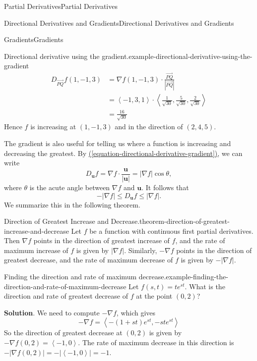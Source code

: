 \documentclass[10pt,]{book}
\numberwithin{equation}{section}
\newcommand{\vv}[1]{\mathbf{#1}}
\newcommand{\grad}{\nabla}
\newcommand{\dotprod}[1]{\left\langle #1 \right\rangle}
\begin{document}
\begin{chapterptx}{Partial Derivatives}{}{Partial Derivatives}{}{}
\begin{sectionptx}{Directional Derivatives and Gradients}{}{Directional Derivatives and Gradients}{}{}
\begin{subsectionptx}{Gradients}{}{Gradients}{}{}
\begin{example}{Directional derivative using the gradient.}{example-directional-derivative-using-the-gradient}
\begin{align*}
D_{\vec{PQ}}f(1,-1,3) & = \grad f (1,-1,3)\cdot\frac{\vec{PQ}}{|\vec{PQ}|} \\
& = \dotprod{-1, 3, 1}\cdot\dotprod{\frac{1}{\sqrt{30}}, \frac{5}{\sqrt{30}}, \frac{2}{\sqrt{30}}} \\
& = \frac{16}{\sqrt{30}} 
\end{align*}
Hence \(f\) is increasing at \((1,-1,3)\) and in the direction of \((2,4,5)\).%
\end{example}
\hypertarget{p-1194}{}%
The gradient is also useful for telling us where a function is increasing and decreasing the greatest. By \hyperref[equation-directional-derivative-gradient]{(\ref{equation-directional-derivative-gradient})}, we can write%
\begin{equation*}
D_{\vv{u}}f = \grad f\cdot\frac{\vv{u}}{|\vv{u}|} = |\grad f| \cos\theta,
\end{equation*}
where \(\theta\) is the acute angle between \(\grad f\) and \(\vv{u}\). It follows that%
\begin{equation*}
-|\grad f| \leq D_{\vv{u}}f \leq |\grad f|.
\end{equation*}
We summarize this in the following theorem.%
\begin{theorem}{Direction of Greatest Increase and Decrease.}{}{theorem-direction-of-greatest-increase-and-decrease}%
\hypertarget{p-1195}{}%
Let \(f\) be a function with continuous first partial derivatives. Then \(\grad f\) points in the direction of greatest increase of \(f\), and the rate of maximum increase of \(f\) is given by \(|\grad f|\). Similarly, \(-\grad f\) points in the direction of greatest decrease, and the rate of maximum decrease of \(f\) is given by \(-|\grad f|\).%
\end{theorem}
\begin{example}{Finding the direction and rate of maximum decrease.}{example-finding-the-direction-and-rate-of-maximum-decrease}%
\hypertarget{p-1196}{}%
Let \(f(s,t) = te^{st}\). What is the direction and rate of greatest decrease of \(f\) at the point \((0,2)\)?%
\par\smallskip%
\noindent\textbf{Solution}.\hypertarget{solution-188}{}\quad%
\hypertarget{p-1197}{}%
We need to compute \(-\grad f\), which gives%
\begin{equation*}
-\grad f = \dotprod{-(1 + st)e^{st}, -ste^{st}}
\end{equation*}
So the direction of greatest decrease at \((0,2)\) is given by \(-\grad f(0,2) = \dotprod{-1, 0}\). The rate of maximum decrease in this direction is \(-|\grad f(0,2)| = -|\dotprod{-1,0}| = -1\).%

\end{example}
\end{subsectionptx}
\end{sectionptx}
\end{chapterptx}
\end{document}
